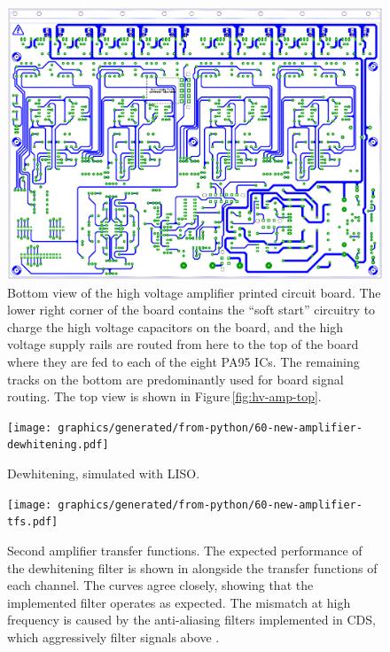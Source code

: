 \begin{figure}
  \centering
  \includegraphics[width=\columnwidth]{graphics/60-hv-amp-bottom.pdf}
  \caption{\label{fig:hv-amp-bottom}Bottom view of the high voltage amplifier printed circuit board. The lower right corner of the board contains the ``soft start'' circuitry to charge the high voltage capacitors on the board, and the high voltage supply rails are routed from here to the top of the board where they are fed to each of the eight PA95 ICs. The remaining tracks on the bottom are predominantly used for board signal routing. The top view is shown in Figure\,\ref{fig:hv-amp-top}.}
\end{figure}

\begin{figure}
  \centering
  \texttt{[image: graphics/generated/from-python/60-new-amplifier-dewhitening.pdf]}
  \caption{Dewhitening, simulated with LISO.}
  \label{fig:new-amplifier-dewhitening}
\end{figure}

\begin{figure}
  \centering
  \texttt{[image: graphics/generated/from-python/60-new-amplifier-tfs.pdf]}
  \caption{Second amplifier transfer functions. The expected performance of the dewhitening filter is shown in  alongside the transfer functions of each channel. The curves agree closely, showing that the implemented filter operates as expected. The mismatch at high frequency is caused by the anti-aliasing filters implemented in CDS, which aggressively filter signals above .}
  \label{fig:new-amplifier-tfs}
\end{figure}

